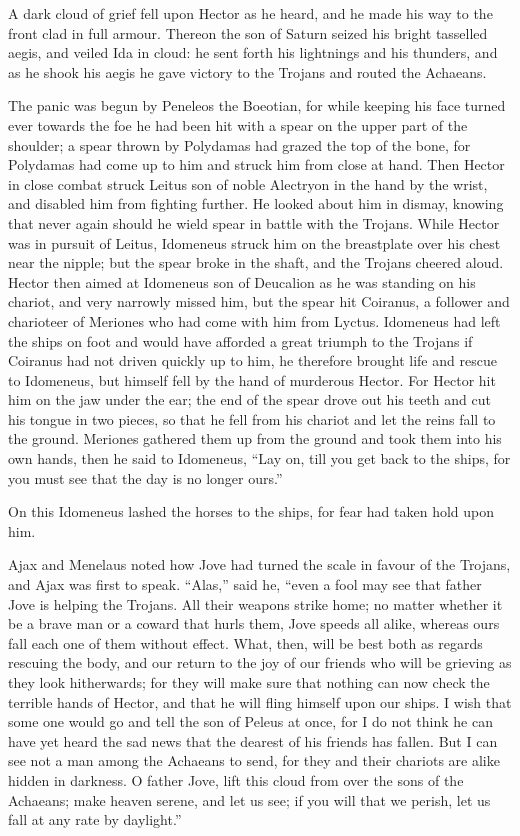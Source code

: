 A dark cloud of grief fell upon Hector as he heard, and he made his way to
the front clad in full armour. Thereon the son of Saturn seized his bright
tasselled aegis, and veiled Ida in cloud: he sent forth his lightnings and
his thunders, and as he shook his aegis he gave victory to the Trojans and
routed the Achaeans.

The panic was begun by Peneleos the Boeotian, for while keeping his face
turned ever towards the foe he had been hit with a spear on the upper part
of the shoulder; a spear thrown by Polydamas had grazed the top of the
bone, for Polydamas had come up to him and struck him from close at hand.
Then Hector in close combat struck Leitus son of noble Alectryon in the
hand by the wrist, and disabled him from fighting further. He looked about
him in dismay, knowing that never again should he wield spear in battle
with the Trojans. While Hector was in pursuit of Leitus, Idomeneus struck
him on the breastplate over his chest near the nipple; but the spear broke
in the shaft, and the Trojans cheered aloud. Hector then aimed at
Idomeneus son of Deucalion as he was standing on his chariot, and very
narrowly missed him, but the spear hit Coiranus, a follower and charioteer
of Meriones who had come with him from Lyctus. Idomeneus had left the
ships on foot and would have afforded a great triumph to the Trojans if
Coiranus had not driven quickly up to him, he therefore brought life and
rescue to Idomeneus, but himself fell by the hand of murderous Hector. For
Hector hit him on the jaw under the ear; the end of the spear drove out
his teeth and cut his tongue in two pieces, so that he fell from his
chariot and let the reins fall to the ground. Meriones gathered them up
from the ground and took them into his own hands, then he said to
Idomeneus, “Lay on, till you get back to the ships, for you must see that
the day is no longer ours.”

On this Idomeneus lashed the horses to the ships, for fear had taken hold
upon him.

Ajax and Menelaus noted how Jove had turned the scale in favour of the
Trojans, and Ajax was first to speak. “Alas,” said he, “even a fool may
see that father Jove is helping the Trojans. All their weapons strike
home; no matter whether it be a brave man or a coward that hurls them,
Jove speeds all alike, whereas ours fall each one of them without effect.
What, then, will be best both as regards rescuing the body, and our return
to the joy of our friends who will be grieving as they look hitherwards;
for they will make sure that nothing can now check the terrible hands of
Hector, and that he will fling himself upon our ships. I wish that some
one would go and tell the son of Peleus at once, for I do not think he can
have yet heard the sad news that the dearest of his friends has fallen.
But I can see not a man among the Achaeans to send, for they and their
chariots are alike hidden in darkness. O father Jove, lift this cloud from
over the sons of the Achaeans; make heaven serene, and let us see; if you
will that we perish, let us fall at any rate by daylight.”

